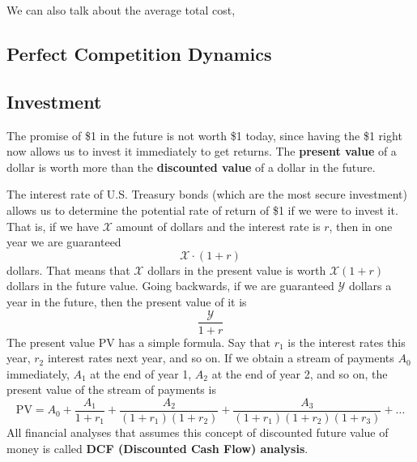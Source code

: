 \documentclass{article}
\begin{document}
      We can also talk about the average total cost, 

  \subsection{Perfect Competition Dynamics}

  \subsection{Investment}

    \begin{definition}
      \label{def:time-value-of-money}
      The promise of \$1 in the future is not worth \$1 today, since having the \$1 right now allows us to invest it immediately to get returns. The \textbf{present value} of a dollar is worth more than the \textbf{discounted value} of a dollar in the future. 

      The interest rate of U.S. Treasury bonds (which are the most secure investment) allows us to determine the potential rate of return of \$1 if we were to invest it. That is, if we have $\mathcal{X}$ amount of dollars and the interest rate is $r$, then in one year we are guaranteed 
      \begin{equation}
        \mathcal{X} \cdot (1 + r)
      \end{equation}
      dollars. That means that $\mathcal{X}$ dollars in the present value is worth $\mathcal{X}(1 + r)$ dollars in the future value. Going backwards, if we are guaranteed $\mathcal{Y}$ dollars a year in the future, then the present value of it is
      \begin{equation}
        \frac{\mathcal{Y}}{1 + r}
      \end{equation}
      The present value PV has a simple formula. Say that $r_1$ is the interest rates this year, $r_2$ interest rates next year, and so on. If we obtain a stream of payments $A_0$ immediately, $A_1$ at the end of year 1, $A_2$ at the end of year 2, and so on, the present value of the stream of payments is
      \begin{equation}
        \text{PV} = A_0 + \frac{A_1}{1 + r_1} + \frac{A_2}{(1+r_1) (1+r_2)} + \frac{A_3}{(1+r_1) (1+r_2) (1+r_3)} + \ldots
      \end{equation}
      All financial analyses that assumes this concept of discounted future value of money is called \textbf{DCF (Discounted Cash Flow) analysis}.
    \end{definition}
\end{document}
